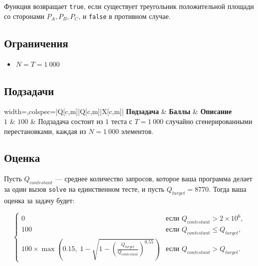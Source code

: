\documentclass[12pt]{article}
\begin{document}
Функция возвращает \texttt{true}, если существует треугольник положительной площади со сторонами $P_A,P_B,P_C$, и \texttt{false} в противном случае.

\newpage

\subsection{Ограничения}
\vspace{0.1em}
\begin{itemize}
	\item $N = T = 1~000$
\end{itemize}

\subsection{Подзадачи}
\begin{table}[H]
	\begin{tblr}{width=\linewidth,colspec={|Q[c,m]|Q[c,m]|X[c,m]|}}
		\hline
		\textbf{Подзадача} & \textbf{Баллы} & \textbf{Описание}\\
		\hline
		$1$ & $100$ & Подзадача состоит из $1$ теста с $T=1~000$ случайно сгенерированными перестановками, каждая из $N=1~000$ элементов.  \\ 
		\hline
	\end{tblr}
	\caption*{Баллы за данную подзадачу начисляются только при прохождении всех её тестов.}
\end{table}
\FloatBarrier

\subsection{Оценка}

Пусть $Q_{contestant}$ — среднее количество запросов, которое ваша программа делает за один вызов \texttt{solve} на единственном тесте, и пусть $Q_{target}=8770$. Тогда ваша оценка за задачу будет:

\[
\begin{cases}
0 & \text{если } Q_{contestant} > 2\times 10^6, \\
100 & \text{если } Q_{contestant} \le Q_{target}, \\
100 \times \max\left(0.15,\; 1-\sqrt{1-\left(\frac{Q_{target}}{Q_{contestant}}\right)^{0.55}}\right) & \text{если } Q_{contestant} > Q_{target}.
\end{cases}
\]

\newpage
\end{document}

